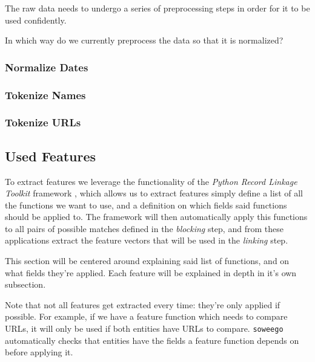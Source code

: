 \documentclass[epsfig,a4paper,11pt,titlepage,twoside,openany]{book}
\begin{document}
The raw data needs to undergo a series of preprocessing steps in order for it to be used confidently.


In which way do we currently preprocess the data so that it is normalized?

\subsubsection{Normalize Dates}
\label{sec:data-preprocessiong-date-normalization}

\subsubsection{Tokenize Names}
\label{sec:data-preprocessiong-name-tokenization}

\subsubsection{Tokenize URLs}
\label{sec:data-preprocessiong-URL-tokenization}



\subsection{Used Features}
\label{sec:used-features}

To extract features we leverage the functionality of the \textit{Python Record Linkage Toolkit} framework \cite{recordlinkage-library}, which allows us to extract features simply define a list of all the functions we want to use, and a definition on which fields said functions should be applied to. The framework will then automatically apply this functions to all pairs of possible matches defined in the \textit{blocking} step, and from these applications extract the feature vectors that will be used in the \textit{linking} step.

This section will be centered around explaining said list of functions, and on what fields they're applied. Each feature will be explained in depth in it's own subsection.

Note that not all features get extracted every time: they're only applied if possible. For example, if we have a feature function which needs to compare URLs, it will only be used if both entities have URLs to compare. \texttt{soweego} automatically checks that entities have the fields a feature function depends on before applying it.
\end{document}
